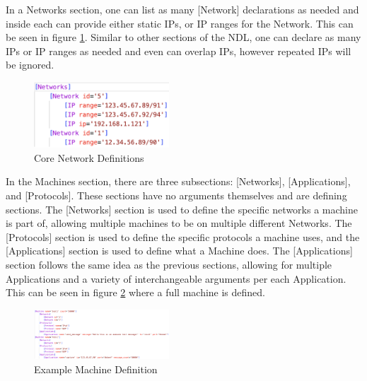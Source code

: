 \documentclass[journal]{IEEEtran} %
\newcommand{\imagewidth}{0.45\textwidth}
\begin{document}
In a Networks section, one can list as many [Network] declarations as needed and inside each can provide either static IPs, or IP ranges for the Network. This can be seen in figure \ref{fig:corenetdef}. Similar to other sections of the NDL, one can declare as many IPs or IP ranges as needed and even can overlap IPs, however repeated IPs will be ignored.


\begin{figure}[H]
    \centerline{\includegraphics[width=\imagewidth]{Images/fig2.png}}
    \caption{Core Network Definitions}
    \label{fig:corenetdef}
\end{figure}

In the Machines section, there are three subsections: [Networks], [Applications], and [Protocols]. These sections have no arguments themselves and are defining sections. The [Networks] section is used to define the specific networks a machine is part of, allowing multiple machines to be on multiple different Networks. The [Protocols] section is used to define the specific protocols a machine uses, and the [Applications] section is used to define what a Machine does. The [Applications] section follows the same idea as the previous sections, allowing for multiple Applications and a variety of interchangeable arguments per each Application. This can be seen in figure \ref{fig:machinedef} where a full machine is defined.

\begin{figure}[H]
    \centerline{\includegraphics[width=\imagewidth]{Images/fig3.png}}
    \caption{Example Machine Definition}
    \label{fig:machinedef}
\end{figure}
\end{document}

